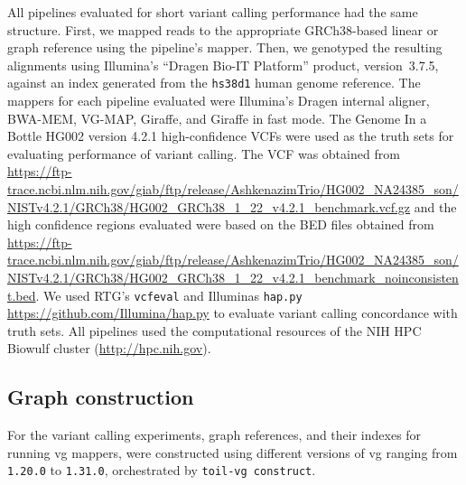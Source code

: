 \documentclass[11pt]{ucscthesis}
\begin{document}
All pipelines evaluated for short variant calling performance had the same structure.
First, we mapped reads to the appropriate GRCh38-based linear or graph reference using the pipeline's mapper.
Then, we genotyped the resulting alignments using Illumina’s ``Dragen Bio-IT Platform'' product, version~3.7.5, against an index generated from the \texttt{hs38d1} human genome reference.
The mappers for each pipeline evaluated were Illumina’s Dragen internal aligner, BWA-MEM, VG-MAP, Giraffe, and Giraffe in fast mode.
The Genome In a Bottle HG002 version 4.2.1 high-confidence VCFs were used as the truth sets for evaluating performance of variant calling\cite{chin2020diploid}.
The VCF was obtained from \url{https://ftp-trace.ncbi.nlm.nih.gov/giab/ftp/release/AshkenazimTrio/HG002_NA24385_son/NISTv4.2.1/GRCh38/HG002_GRCh38_1_22_v4.2.1_benchmark.vcf.gz} and the high confidence regions evaluated were based on the BED files obtained from \url{https://ftp-trace.ncbi.nlm.nih.gov/giab/ftp/release/AshkenazimTrio/HG002_NA24385_son/NISTv4.2.1/GRCh38/HG002_GRCh38_1_22_v4.2.1_benchmark_noinconsistent.bed}.
We used RTG's \texttt{vcfeval} \cite{cleary2015comparing} and Illuminas \texttt{hap.py} \url{https://github.com/Illumina/hap.py} to evaluate variant calling concordance with truth sets.
All pipelines used the computational resources of the NIH HPC Biowulf cluster (\url{http://hpc.nih.gov}).


\subsection{Graph construction} \label{subsec:aim2:graph_construction}
For the variant calling experiments, graph references, and their indexes for running vg mappers, were constructed using different versions of vg ranging from \texttt{1.20.0} to \texttt{1.31.0}, orchestrated by \texttt{toil-vg~construct}.
\end{document}
